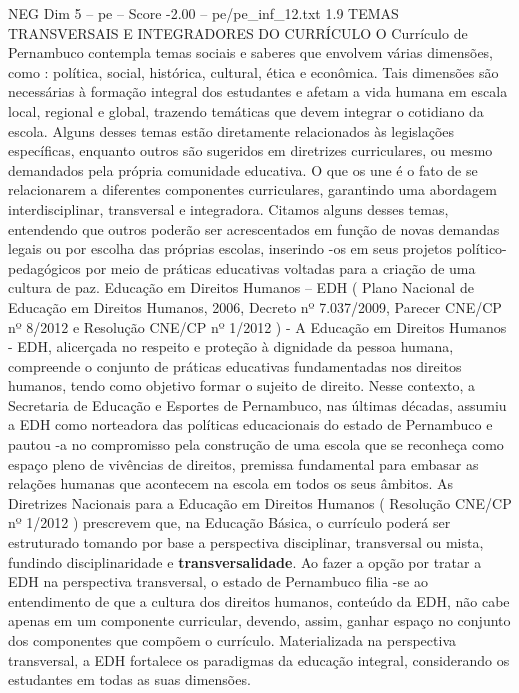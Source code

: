 \begin{textsample}{NEG Dim 5 – pe – Score -2.00 – pe/pe\_inf\_12.txt}  \label{ex:f5_neg_081}
1.9 TEMAS TRANSVERSAIS E INTEGRADORES DO CURRÍCULO O Currículo de Pernambuco contempla temas sociais e saberes que envolvem várias dimensões, como : política, social, histórica, cultural, ética e econômica.
Tais dimensões são necessárias à formação integral dos estudantes e afetam a vida humana em escala local, regional e global, trazendo temáticas que devem integrar o cotidiano da escola.
Alguns desses temas estão diretamente relacionados às legislações específicas, enquanto outros são sugeridos em diretrizes curriculares, ou mesmo demandados pela própria comunidade educativa.
O que os une é o fato de se relacionarem a diferentes componentes curriculares, garantindo uma abordagem interdisciplinar, transversal e integradora.
Citamos alguns desses temas, entendendo que outros poderão ser acrescentados em função de novas demandas legais ou por escolha das próprias escolas, inserindo -os em seus projetos político-pedagógicos por meio de práticas educativas voltadas para a criação de uma cultura de paz.
Educação em Direitos Humanos – EDH ( Plano Nacional de Educação em Direitos Humanos, 2006, Decreto nº 7.037/2009, Parecer CNE/CP nº 8/2012 e Resolução CNE/CP nº 1/2012 ) - A Educação em Direitos Humanos - EDH, alicerçada no respeito e proteção à dignidade da pessoa humana, compreende o conjunto de práticas educativas fundamentadas nos direitos humanos, tendo como objetivo formar o sujeito de direito.
Nesse contexto, a Secretaria de Educação e Esportes de Pernambuco, nas últimas décadas, assumiu a EDH como norteadora das políticas educacionais do estado de Pernambuco e pautou -a no compromisso pela construção de uma escola que se reconheça como espaço pleno de vivências de direitos, premissa fundamental para embasar as relações humanas que acontecem na escola em todos os seus âmbitos.
As Diretrizes Nacionais para a Educação em Direitos Humanos ( Resolução CNE/CP nº 1/2012 ) prescrevem que, na Educação Básica, o currículo poderá ser estruturado tomando por base a perspectiva disciplinar, transversal ou mista, fundindo disciplinaridade e \textbf{transversalidade}.
Ao fazer a opção por tratar a EDH na perspectiva transversal, o estado de Pernambuco filia -se ao entendimento de que a cultura dos direitos humanos, conteúdo da EDH, não cabe apenas em um componente curricular, devendo, assim, ganhar espaço no conjunto dos componentes que compõem o currículo.
Materializada na perspectiva transversal, a EDH fortalece os paradigmas da educação integral, considerando os estudantes em todas as suas dimensões.

\end{textsample}
